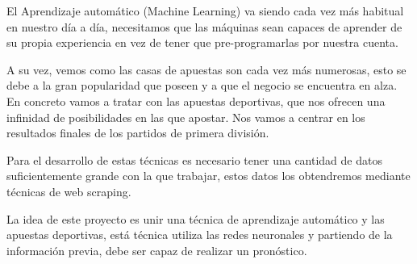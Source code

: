 
El Aprendizaje automático (Machine Learning) va siendo cada vez más habitual en nuestro día a día, necesitamos que las máquinas sean capaces de aprender de su propia experiencia en vez de tener que pre-programarlas por nuestra cuenta.

A su vez, vemos como las casas de apuestas son cada vez más numerosas, esto se debe a la gran popularidad que poseen y a que el negocio se encuentra en alza. En concreto vamos a tratar con las apuestas deportivas, que nos ofrecen una infinidad de posibilidades en las que apostar. Nos vamos a centrar en los resultados finales  de los partidos de primera división.

Para el desarrollo de estas técnicas es necesario tener una cantidad de datos suficientemente grande con la que trabajar, estos datos los obtendremos mediante técnicas de web scraping.

La idea de este proyecto es unir una técnica de aprendizaje automático y las apuestas deportivas,
está técnica utiliza las redes neuronales y partiendo de la información previa, debe ser capaz de realizar un pronóstico.




